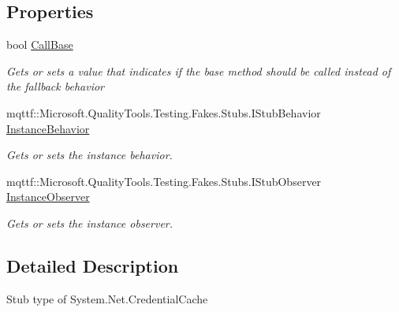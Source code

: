 \subsection*{Properties}
\begin{DoxyCompactItemize}
\item 
bool \hyperlink{class_system_1_1_net_1_1_fakes_1_1_stub_credential_cache_a572430f3092e4bbe214a19980953be23}{Call\-Base}
\begin{DoxyCompactList}\small\item\em Gets or sets a value that indicates if the base method should be called instead of the fallback behavior\end{DoxyCompactList}\item 
mqttf\-::\-Microsoft.\-Quality\-Tools.\-Testing.\-Fakes.\-Stubs.\-I\-Stub\-Behavior \hyperlink{class_system_1_1_net_1_1_fakes_1_1_stub_credential_cache_a766d15153cdb4afda7784d2298a42b2e}{Instance\-Behavior}
\begin{DoxyCompactList}\small\item\em Gets or sets the instance behavior.\end{DoxyCompactList}\item 
mqttf\-::\-Microsoft.\-Quality\-Tools.\-Testing.\-Fakes.\-Stubs.\-I\-Stub\-Observer \hyperlink{class_system_1_1_net_1_1_fakes_1_1_stub_credential_cache_a49b8f77ea6178725f76d28b64e92683f}{Instance\-Observer}
\begin{DoxyCompactList}\small\item\em Gets or sets the instance observer.\end{DoxyCompactList}\end{DoxyCompactItemize}


\subsection{Detailed Description}
Stub type of System.\-Net.\-Credential\-Cache



